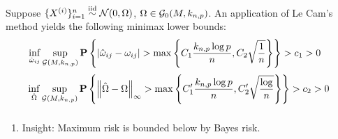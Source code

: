 \begin{frame}[fragile] \frametitle{}

    \vspace{0.5cm}
    Suppose $\{X^{(i)}\}_{i=1}^n \stackrel{\mathrm{iid}}{\sim} \mathcal{N}(0, \Omega)$, $\Omega \in \mathcal{G}_0(M,
    k_{n, p})$.  An application of Le Cam's method yields the following minimax
    lower bounds:
    \vspace{0.2cm}
    $$
    \hspace{-0.5cm}
    \inf_{\hat\omega_{ij}} \sup_{\Gg(M, k_{n, p})}
    \PP\left\{
    |\hat\omega_{ij} - \omega_{ij}| > \max\left\{
    C_1\frac{k_{n, p}\log p}{n}, C_2 \sqrt\frac{1}{n}
    \right\}
    \right\} > c_1 > 0
    $$
    $$
    \hspace{-0.2cm}
    \inf_{\hat\Omega} \sup_{\Gg(M, k_{n, p})}
    \PP\left\{
        \norm{\hat\Omega - \Omega}_\infty > \max\left\{
    C_1'\frac{k_{n, p}\log p}{n}, C_2' \sqrt\frac{\log}{n}
    \right\}
    \right\} > c_2 > 0
    $$
    
\end{frame}
\begin{frame}[fragile] \frametitle{}
    \begin{enumerate}
        \item Insight: Maximum risk is bounded below by Bayes risk.
    \end{enumerate}
\end{frame}
\begin{frame}[fragile] \frametitle{}
\end{frame}


